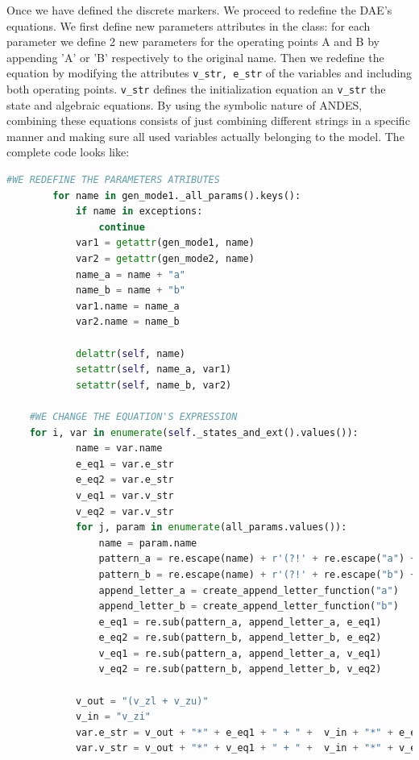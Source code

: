 \documentclass{report}
\begin{document}
Once we have defined the discrete markers. We proceed to redefine the DAE's equations. We first define new parameters attributes in the class: for each parameter we define 2 new parameters for the operating points A and B by appending 'A' or 'B' respectively to the original name. Then we redefine the equation by modifying the attributes \lstinline!v_str, e_str! of the variables and including both operating points. \lstinline!v_str! defines the initialization equation an \lstinline!v_str! the state and algebraic equations. By using the symbolic nature of ANDES, combining these equations consists of just combining different strings in a specific manner and making sure all used variables actually belonging to the model. The complete code looks like:\\

\begin{lstlisting}[language=Python, basicstyle=\small, breaklines=true]
    #WE REDEFINE THE PARAMETERS ATRIBUTES
        for name in gen_mode1._all_params().keys():
            if name in exceptions:
                continue
            var1 = getattr(gen_mode1, name)
            var2 = getattr(gen_mode2, name)
            name_a = name + "a"
            name_b = name + "b"
            var1.name = name_a
            var2.name = name_b
            
            delattr(self, name)
            setattr(self, name_a, var1)
            setattr(self, name_b, var2)
    
    #WE CHANGE THE EQUATION'S EXPRESSION
    for i, var in enumerate(self._states_and_ext().values()):
            name = var.name
            e_eq1 = var.e_str
            e_eq2 = var.e_str
            v_eq1 = var.v_str
            v_eq2 = var.v_str
            for j, param in enumerate(all_params.values()):
                name = param.name
                pattern_a = re.escape(name) + r'(?!' + re.escape("a") + r')'
                pattern_b = re.escape(name) + r'(?!' + re.escape("b") + r')'
                append_letter_a = create_append_letter_function("a")
                append_letter_b = create_append_letter_function("b")
                e_eq1 = re.sub(pattern_a, append_letter_a, e_eq1)
                e_eq2 = re.sub(pattern_b, append_letter_b, e_eq2)
                v_eq1 = re.sub(pattern_a, append_letter_a, v_eq1)
                v_eq2 = re.sub(pattern_b, append_letter_b, v_eq2) 

            v_out = "(v_zl + v_zu)"
            v_in = "v_zi"   
            var.e_str = v_out + "*" + e_eq1 + " + " +  v_in + "*" + e_eq2                
            var.v_str = v_out + "*" + v_eq1 + " + " +  v_in + "*" + v_eq2                          
\end{lstlisting}
\end{document}
